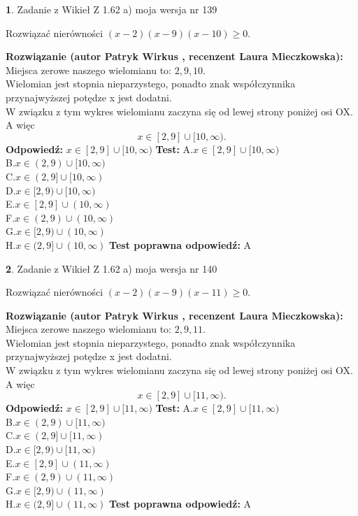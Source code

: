 \documentclass[12pt, a4paper]{article}
\theoremstyle{definition} %
\newtheorem{zad}{}
\newcommand{\zadStart}[1]{\begin{zad}#1\newline}
\newcommand{\zadStop}{\end{zad}}
\newcommand{\rozwStart}[2]{\noindent \textbf{Rozwiązanie (autor #1 , recenzent #2): }\newline}
\newcommand{\rozwStop}{\newline}
\newcommand{\odpStart}{\noindent \textbf{Odpowiedź:}\newline}
\newcommand{\odpStop}{\newline}
\newcommand{\testStart}{\noindent \textbf{Test:}\newline}
\newcommand{\testStop}{\newline}
\newcommand{\kluczStart}{\noindent \textbf{Test poprawna odpowiedź:}\newline}
\newcommand{\kluczStop}{\newline}
\begin{document}
\zadStart{Zadanie z Wikieł Z 1.62 a) moja wersja nr 139}

Rozwiązać nierówności $(x-2)(x-9)(x-10)\ge0$.
\zadStop
\rozwStart{Patryk Wirkus}{Laura Mieczkowska}
Miejsca zerowe naszego wielomianu to: $2, 9, 10$.\\
Wielomian jest stopnia nieparzystego, ponadto znak współczynnika przy\linebreak najwyższej potędze x jest dodatni.\\ W związku z tym wykres wielomianu zaczyna się od lewej strony poniżej osi OX. A więc $$x \in [2,9] \cup [10,\infty).$$
\rozwStop
\odpStart
$x \in [2,9] \cup [10,\infty)$
\odpStop
\testStart
A.$x \in [2,9] \cup [10,\infty)$\\
B.$x \in (2,9) \cup [10,\infty)$\\
C.$x \in (2,9] \cup [10,\infty)$\\
D.$x \in [2,9) \cup [10,\infty)$\\
E.$x \in [2,9] \cup (10,\infty)$\\
F.$x \in (2,9) \cup (10,\infty)$\\
G.$x \in [2,9) \cup (10,\infty)$\\
H.$x \in (2,9] \cup (10,\infty)$
\testStop
\kluczStart
A
\kluczStop



\zadStart{Zadanie z Wikieł Z 1.62 a) moja wersja nr 140}

Rozwiązać nierówności $(x-2)(x-9)(x-11)\ge0$.
\zadStop
\rozwStart{Patryk Wirkus}{Laura Mieczkowska}
Miejsca zerowe naszego wielomianu to: $2, 9, 11$.\\
Wielomian jest stopnia nieparzystego, ponadto znak współczynnika przy\linebreak najwyższej potędze x jest dodatni.\\ W związku z tym wykres wielomianu zaczyna się od lewej strony poniżej osi OX. A więc $$x \in [2,9] \cup [11,\infty).$$
\rozwStop
\odpStart
$x \in [2,9] \cup [11,\infty)$
\odpStop
\testStart
A.$x \in [2,9] \cup [11,\infty)$\\
B.$x \in (2,9) \cup [11,\infty)$\\
C.$x \in (2,9] \cup [11,\infty)$\\
D.$x \in [2,9) \cup [11,\infty)$\\
E.$x \in [2,9] \cup (11,\infty)$\\
F.$x \in (2,9) \cup (11,\infty)$\\
G.$x \in [2,9) \cup (11,\infty)$\\
H.$x \in (2,9] \cup (11,\infty)$
\testStop
\kluczStart
A
\kluczStop
\end{document}
